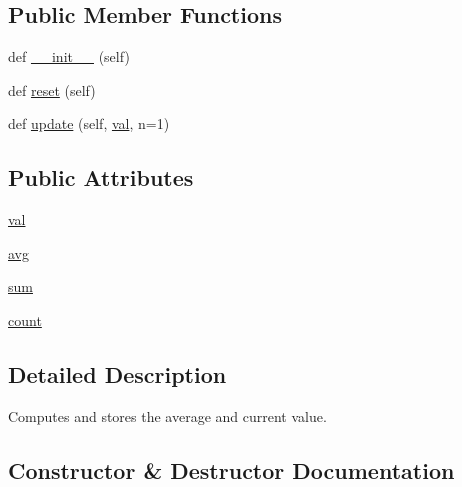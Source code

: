 \subsection*{Public Member Functions}
\begin{DoxyCompactItemize}
\item 
def \hyperlink{classparlai_1_1agents_1_1drqa_1_1utils_1_1AverageMeter_a5d31ec2b9b8020da43ab0ca600cbe561}{\+\_\+\+\_\+init\+\_\+\+\_\+} (self)
\item 
def \hyperlink{classparlai_1_1agents_1_1drqa_1_1utils_1_1AverageMeter_adf03b2f21b820b30c0bf68334bda0b6e}{reset} (self)
\item 
def \hyperlink{classparlai_1_1agents_1_1drqa_1_1utils_1_1AverageMeter_a5a66f2a884034fcdf004468a980d1318}{update} (self, \hyperlink{classparlai_1_1agents_1_1drqa_1_1utils_1_1AverageMeter_a0b98a68fd8e5d78852462e6ab3822760}{val}, n=1)
\end{DoxyCompactItemize}
\subsection*{Public Attributes}
\begin{DoxyCompactItemize}
\item 
\hyperlink{classparlai_1_1agents_1_1drqa_1_1utils_1_1AverageMeter_a0b98a68fd8e5d78852462e6ab3822760}{val}
\item 
\hyperlink{classparlai_1_1agents_1_1drqa_1_1utils_1_1AverageMeter_aee254ce04bba670cb5839d0d8b602906}{avg}
\item 
\hyperlink{classparlai_1_1agents_1_1drqa_1_1utils_1_1AverageMeter_ab4cfd9c6c69772ef8828a14e3217508a}{sum}
\item 
\hyperlink{classparlai_1_1agents_1_1drqa_1_1utils_1_1AverageMeter_a4b3a149e43ba378d8cc4af3885e0c68f}{count}
\end{DoxyCompactItemize}


\subsection{Detailed Description}
\begin{DoxyVerb}Computes and stores the average and current value.
\end{DoxyVerb}
 

\subsection{Constructor \& Destructor Documentation}
\mbox{\label{classparlai_1_1agents_1_1drqa_1_1utils_1_1AverageMeter_a5d31ec2b9b8020da43ab0ca600cbe561}} 
